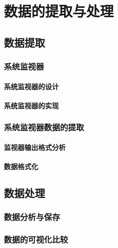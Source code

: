 

\chapter{数据的提取与处理}

\section{数据提取}

\subsection{系统监视器}

\subsubsection{系统监视器的设计}
\subsubsection{系统监视器的实现}

\subsection{系统监视器数据的提取}

\subsubsection{监视器输出格式分析}
\subsubsection{数据格式化}

\section{数据处理}

\subsection{数据分析与保存}


\subsection{数据的可视化比较}


